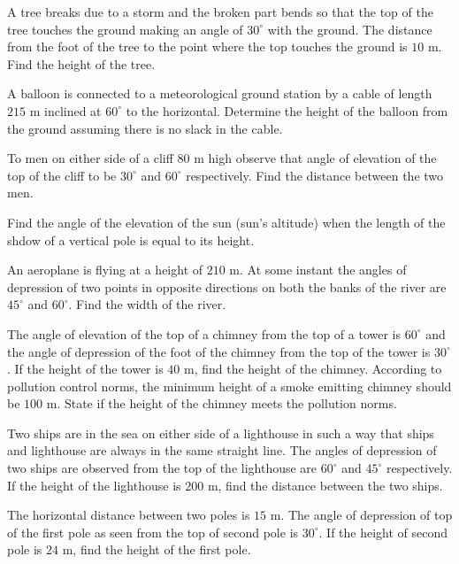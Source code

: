 \item A tree breaks due to a storm and the broken part bends so that the top of the tree touches the ground making an angle of
  $30^\circ$ with the ground. The distance from the foot of the tree to the point where the top touches the ground is
  $10$ m. Find the height of the tree.

\item A balloon is connected to a meteorological ground station by a cable of length $215$ m inclined at $60^\circ$ to
  the horizontal. Determine the height of the balloon from the ground assuming there is no slack in the cable.

\item To men on either side of a cliff $80$ m high observe that angle of elevation of the top of the cliff to be
  $30^\circ$ and $60^\circ$ respectively. Find the distance between the two men.

\item Find the angle of the elevation of the sun (sun's altitude) when the length of the shdow of a vertical pole is equal to its
  height.

\item An aeroplane is flying at a height of $210$ m. At some instant the angles of depression of two points in opposite
  directions on both the banks of the river are $45^\circ$ and $60^\circ$. Find the width of the river.

\item The angle of elevation of the top of a chimney from the top of a tower is $60^\circ$ and the angle of depression of the
  foot of the chimney from the top of the tower is $30^\circ$. If the height of the tower is $40$ m, find the height
  of the chimney. According to pollution control norms, the minimum height of a smoke emitting chimney should be
  $100$ m. State if the height of the chimney meets the pollution norms.

\item Two ships are in the sea on either side of a lighthouse in such a way that ships and lighthouse are always in the same straight
  line. The angles of depression of two ships are observed from the top of the lighthouse are $60^\circ$ and
  $45^\circ$ respectively. If the height of the lighthouse is $200$ m, find the distance between the two ships.

\item The horizontal distance between two poles is $15$ m. The angle of depression of top of the first pole as seen from the
  top of second pole is $30^\circ$. If the height of second pole is $24$ m, find the height of the first pole.

